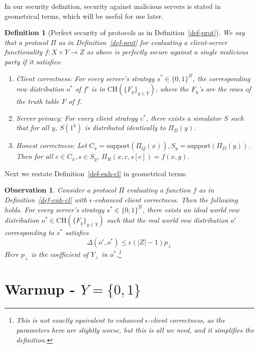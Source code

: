 \documentclass[a4paper]{article}
\newtheorem{definition}{Definition}[section]
\newtheorem{observation}{Observation}
\newcommand{\support}{\mathrm{support}}
\newcommand{\CH}[1]{\text{CH}(#1)}
\begin{document}
In our security definition, security against malicious servers is stated in geometrical terms, which will be useful for use later.

\begin{definition}[Perfect security of protocols as in Definition~\ref{def-prot}]\label{perfect-security}
We say that a protocol $\Pi$ as in Definition~\ref{def-prot} for evaluating a client-server functionality $f:X\times Y\rightarrow Z$ as above is perfectly secure against a single malicious party if it satisfies:
\begin{enumerate}
\item Client correctness: For every server's strategy $s^*\in \{0,1\}^{2l}$, the corresponding row distribution $o^*$ of $f'$
is in $\CH{\{F_y\}_{y\in Y}}$, where the $F_y$'s are the rows of the truth table $F$ of $f$.
\item Server privacy: For every client strategy $c^*$, there exists a simulator $S$ such that for all $y$,
$S(1^k)$ is distributed identically to $\Pi_D(y)$. 

\item Honest correctness: Let $C_x=\support(\Pi_Q(x)),S_y=\support(\Pi_D(y))$. Then for all $c\in C_x,s\in S_y$, $\Pi_R(x,c,s[c])=f(x,y)$.
\end{enumerate}
\end{definition}

Next we restate Definition~\ref{def-enh-cl} in geometrical terms.

\begin{observation}\label{obs-geom-enh-cl}
	Consider a protocol $\Pi$ evaluating a function $f$ as in Definition~\ref{def-enh-cl} with $\epsilon$-enhanced client correctness.
	Then the following holds. 
	For every server's strategy $s^*\in \{0,1\}^{2l}$, 
	there exists an ideal world row distribution $o^*\in \CH{\{F_y\}_{y\in Y}}$ such that 
	the real world row distribution $o'$ corresponding to $s^*$
	satisfies 
	\[\Delta(o',o^*)\leq \epsilon(|Z|-1)p_\bot\]
	Here $p_\bot$ is the coefficient of $Y_\bot$ in $o^*$.\footnote{This is not exactly equivalent to enhanced $\epsilon$-client correctness, as the parameters here are slightly worse, but this is all we need, and it simplifies the definition.}
\end{observation} 

\section{Warmup - $Y=\{0,1\}$}
\end{document}
